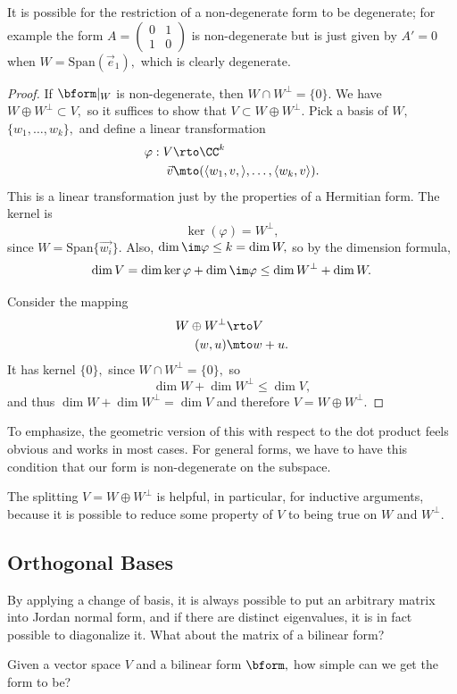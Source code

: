 It is possible for the restriction of a non-degenerate form to be degenerate; for example the form $A = \begin{pmatrix}0 & 1 \\ 1 & 0\end{pmatrix}$ is non-degenerate but is just given by $A' = 0$ when $W = \text{Span}(\vec{e}_1),$ which is clearly degenerate.

\begin{proof}
If $\bform|_W$ is non-degenerate, then $W \cap W^\perp = \{0\}.$ We have $W \oplus W^\perp \subset V,$
so it suffices to show that $V \subset W \oplus W^\perp.$ Pick a basis of $W,$ $\{w_1, \ldots, w_k\},$ and define a linear transformation 
\begin{align*}
    \varphi: V &\rto \CC^k \\
    \vec{v} &\mto (\langle w_1, v, \rangle, \ldots, \langle w_k, v \rangle).
\end{align*}
This is a linear transformation just by the properties of a Hermitian form.
The kernel is \[
\ker(\varphi) = W^\perp,
\]
since $W = \text{Span}\{\vec{w_i}\}.$ Also, $\dim \im \varphi \leq k = \dim W,$ so by the dimension formula,
\[
\dim V = \dim \ker\varphi + \dim \im \varphi \leq \dim W^\perp + \dim W.
\]

Consider the mapping
\begin{align*}
    W \oplus W^\perp &\rto V \\
    (w, u) &\mto w + u.
\end{align*}
It has kernel $\{0\},$ since $W \cap W^\perp = \{0\},$ so 
\[
\dim W + \dim W^\perp \leq \dim V,
\]
and thus $\dim W + \dim W^\perp = \dim V$ and therefore $V = W \oplus W^\perp.$
\end{proof}

To emphasize, the geometric version of this with respect to the dot product feels obvious and works in most cases. For general forms, we have to have this condition that our form is non-degenerate on the subspace.

The splitting $V = W \oplus W^\perp$ is helpful, in particular, for inductive arguments, because it is possible to reduce some property of $V$ to being true on $W$ and $W^\perp.$

\subsection{Orthogonal Bases}

By applying a change of basis, it is always possible to put an arbitrary matrix into Jordan normal form, and if there are distinct eigenvalues, it is in fact possible to diagonalize it. What about the matrix of a bilinear form?
\begin{qq}
Given a vector space $V$ and a bilinear form $\bform,$ how simple can we get the form to be?
\end{qq}

